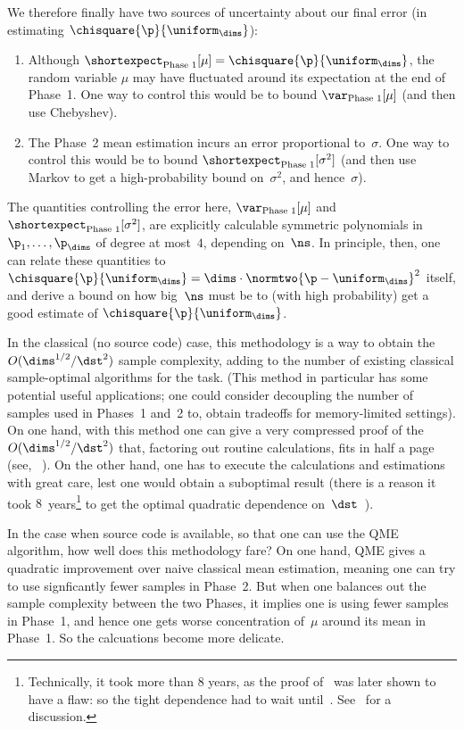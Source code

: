 \documentclass[11pt]{article}
\newcommand{\E}{\shortexpect}
\begin{document}
We therefore finally have two sources of uncertainty about our final error (in estimating $\chisquare{\p}{\uniform_\dims}$):
\begin{enumerate}
  \item Although $\E_{\text{Phase~1}}[\mu] = \chisquare{\p}{\uniform_\dims}$, the random variable $\mu$ may have fluctuated around its expectation at the end of Phase~1.  One way to control this would be to bound $\var_{\text{Phase~1}}[\mu]$ (and then use Chebyshev).
  \item The Phase~2 mean estimation incurs an error proportional to~$\sigma$. One way to control this would be to bound $\E_{\text{Phase~1}}[\sigma^2]$ (and then use Markov to get a high-probability bound on~$\sigma^2$, and hence~$\sigma$).
\end{enumerate}
The quantities controlling the error here, $\var_{\text{Phase~1}}[\mu]$ and $\E_{\text{Phase~1}}[\sigma^2]$, are explicitly calculable symmetric polynomials in $\p_1, \dots, \p_\dims$ of degree at most~$4$, depending on~$\ns$.
In principle, then, one can relate these quantities to $\chisquare{\p}{\uniform_\dims} = \dims \cdot \normtwo{\p-\uniform_\dims}^2$ itself, and derive a bound on how big~$\ns$ must be to (with high probability) get a good estimate of $\chisquare{\p}{\uniform_\dims}$. 

In the classical (no source code) case, this methodology is a way to obtain the $O(\dims^{1/2}/\dst^2)$ sample complexity, adding to the number of existing classical sample-optimal algorithms for the task.
(This method in particular has some potential useful applications; \eg  one could consider decoupling the number of samples used in Phases~1 and~2 to, \eg obtain tradeoffs for memory-limited settings).
On one hand, with this method one can give a very compressed proof of the $O(\dims^{1/2}/\dst^2)$ that, factoring out routine calculations, 
%
fits in half a page (see, \eg~\cite[Sec.~10]{OW23}). 
%
On the other hand, one has to execute the calculations and estimations with great care, lest one would obtain a suboptimal result (there is a reason it took $8$~years\footnote{Technically, it took more than $8$ years, as the proof of~\cite{Paninski08} was later shown to have a flaw: so the tight dependence had to wait until~\cite{AcharyaDK15}. See~\cite[Section~2.3]{CanonneTopicsDT2022} for a discussion.} to get the optimal quadratic dependence on~$\dst$~\cite{GRexp:00,Paninski08}). 

In the case when source code is available, so that one can use the QME algorithm, how well does this methodology fare?  
On one hand, QME gives a quadratic improvement over naive classical mean estimation, meaning one can try to use signficantly fewer samples in Phase~2.  
But when one balances out the sample complexity between the two Phases, it implies one is using fewer samples in Phase~1, and hence one gets worse concentration of~$\mu$ around its mean in Phase~1. 
So the calcuations become more delicate.
\end{document}
